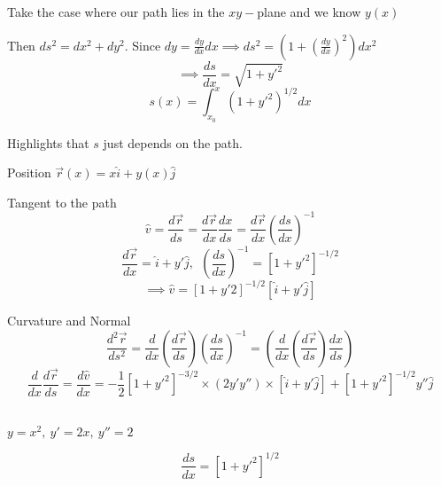 Take the case where our path lies in the $xy-$plane and we know $y(x)$
\vspace*{100pt}

Then $ds^2 = dx^2 + dy^2$. Since $dy = \frac{dy}{dx}dx \implies ds^2 = (1 + (\frac{dy}{dx})^2 )dx^2$
\[\implies \frac{ds}{dx} = \sqrt{1 + y'^2}\]
\[s(x) = \int_{x_0}^x (1 + y'^2)^{1/2}dx\]

Highlights that $s$ just depends on the path. 


Position $\vec{r}(x) = x\hat{i} + y(x)\hat{j}$

Tangent to the path
\[\hat{v} = \frac{d\vec{r}}{ds} = \frac{d\vec{r}}{dx}\frac{dx}{ds} = \frac{d\vec{r}}{dx}\left(\frac{ds}{dx}\right)^{-1}\]
\[\frac{d\vec{r}}{dx} = \hat{i} + y'\hat{j},~~\left(\frac{ds}{dx}\right)^{-1} = [1 + y'^2]^{-1/2}\]
\[\implies \hat{v} = [1+y'2]^{-1/2}[\hat{i} + y'\hat{j}]\]

Curvature and Normal
\[\frac{d^2\vec{r}}{ds^2} = \frac{d}{dx}\left(\frac{d\vec{r}}{ds}\right)\left(\frac{ds}{dx}\right)^{-1} = \left(\frac{d}{dx}\left(\frac{d\vec{r}}{ds}\right)\frac{dx}{ds}\right)\]
\[\frac{d}{dx}\frac{d\vec{r}}{ds} = \frac{d\hat{v}}{dx} = -\frac{1}{2}[1+y'^2]^{-3/2} \times (2y'y'')\times [\hat{i} + y'\hat{j}] + [1 + y'^2]^{-1/2}y''\hat{j}\]~


\begin{example}
$y = x^2,~y' = 2x,~ y'' = 2$

\[\frac{ds}{dx} = [1 + y'^2]^{1/2}\]	
\end{example}









